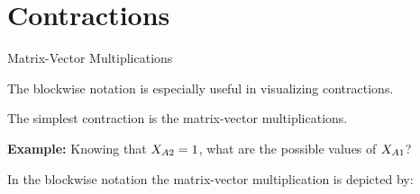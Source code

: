 \documentclass{beamer}
\begin{document}
    \section{Contractions}

    \begin{frame}{Matrix-Vector Multiplications}

        The blockwise notation is especially useful in visualizing contractions.

        The simplest contraction is the matrix-vector multiplications.
        \medskip

        {\bf Example:} Knowing that $X_{A2}=1$, what are the possible values of $X_{A1}$?

        \begin{center}
        \end{center}

        In the blockwise notation the matrix-vector multiplication is depicted by:
        \begin{center}
        \end{center}
    \end{frame}
\end{document}
